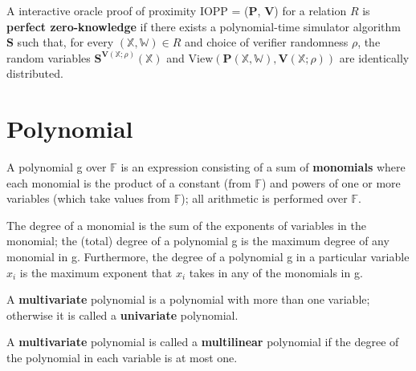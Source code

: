 \begin{definition}

A interactive oracle proof of proximity IOPP = ($\textbf{P}$, $\textbf{V}$) for a relation $R$ is \textbf{perfect zero-knowledge} if there exists a polynomial-time simulator algorithm $\textbf{S}$ such that, for every $(\mathbb{X}, \mathbb{W}) \in R$ and choice of verifier randomness $\rho$, the random variables $\textbf{S}^{\textbf{V}(\mathbb{X};\rho)}(\mathbb{X})$ and $\text{View}(\textbf{P}(\mathbb{X}, \mathbb{W}), \textbf{V}(\mathbb{X};\rho))$ are identically distributed.
 
\end{definition}

\section{Polynomial}

\begin{definition}
A polynomial g over $\mathbb{F}$ is an expression consisting of a sum of \textbf{monomials} where each monomial is the product of a constant (from $\mathbb{F}$) and powers of one or more variables (which take values from $\mathbb{F}$); all arithmetic is performed over $\mathbb{F}$.
\end{definition}

\begin{definition}
The degree of a monomial is the sum of the exponents of variables in the monomial; the (total) degree of a polynomial g is the maximum degree of any monomial in g. Furthermore, the degree of a polynomial g in a particular variable $x_i$ is the maximum exponent that $x_i$ takes in any of the monomials in g.
\end{definition}

\begin{definition}
A \textbf{multivariate} polynomial is a polynomial with more than one variable; otherwise it is called a \textbf{univariate} polynomial.
\end{definition}

\begin{definition}
A \textbf{multivariate} polynomial is called a \textbf{multilinear} polynomial if the degree of the polynomial in each variable is at most one.
\end{definition}


